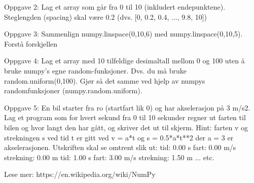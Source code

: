 Oppgave 2: Lag et array som går fra 0 til 10 (inkludert endepunktene). 
Steglengden (spacing) skal være 0.2  (dvs. [0, 0.2, 0.4, ..., 9.8, 10])


Oppgave 3: Sammenlign numpy.linspace(0,10,6) med numpy.linspace(0,10,5). Forstå forskjellen


Oppgave 4: Lag et array med 10 tilfeldige desimaltall mellom 0 og 100 
uten å bruke numpy's egne random-funksjoner. 
Dvs. du må bruke random.uniform(0,100).
Gjør så det samme ved hjelp av numpys randomfunksjoner (numpy.random.uniform).


Oppgave 5: 
En bil starter fra ro (startfart lik 0) og har akselerasjon på 3 m/s2. 
Lag et program som for hvert sekund fra 0 til 10 sekunder regner ut farten til bilen 
og hvor langt den har gått, og skriver det ut til skjerm. 
Hint: farten v og strekningen s ved tid t er gitt ved v = a*t og s = 0.5*a*t**2 der a = 3 er akselerasjonen.
Utskriften skal se omtrent slik ut:
tid:  0.00 s    fart:  0.00 m/s    strekning:   0.00 m
tid:  1.00 s    fart:  3.00 m/s    strekning:   1.50 m
... etc. 


Lese mer: https://en.wikipedia.org/wiki/NumPy
